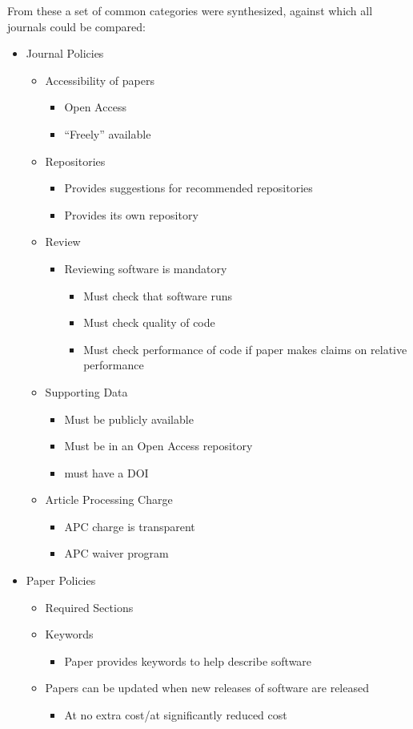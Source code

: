 \documentclass[11pt, oneside]{amsart}
\begin{document}
From these a set of common categories were synthesized, against which all
journals could be compared:

\begin{itemize}
\item Journal Policies
\begin{itemize}
	\item Accessibility of papers
	\begin{itemize}
		\item Open Access
		\item ``Freely'' available
	\end{itemize}
	\item Repositories
	\begin{itemize}
		\item Provides suggestions for recommended repositories
		\item Provides its own repository
	\end{itemize}
	\item Review
	\begin{itemize}
		\item Reviewing software is mandatory
		\begin{itemize}
			\item Must check that software runs
			\item Must check quality of code
			\item Must check performance of code if paper makes claims on relative performance
		\end{itemize}
	\end{itemize}	
	\item Supporting Data
	\begin{itemize}
		\item Must be publicly available
		\item Must be in an Open Access repository
		\item must have a DOI
	\end{itemize}
	\item Article Processing Charge
	\begin{itemize}
		\item APC charge is transparent
		\item APC waiver program
	\end{itemize}
\end{itemize}

\item Paper Policies
\begin{itemize}
	\item Required Sections
	\item Keywords
	\begin{itemize}
		\item Paper provides keywords to help describe software
	\end{itemize}
	\item Papers can be updated when new releases of software are released
	\begin{itemize}
		\item At no extra cost/at significantly reduced cost
	\end{itemize}
\end{itemize}


\end{itemize}
\end{document}
